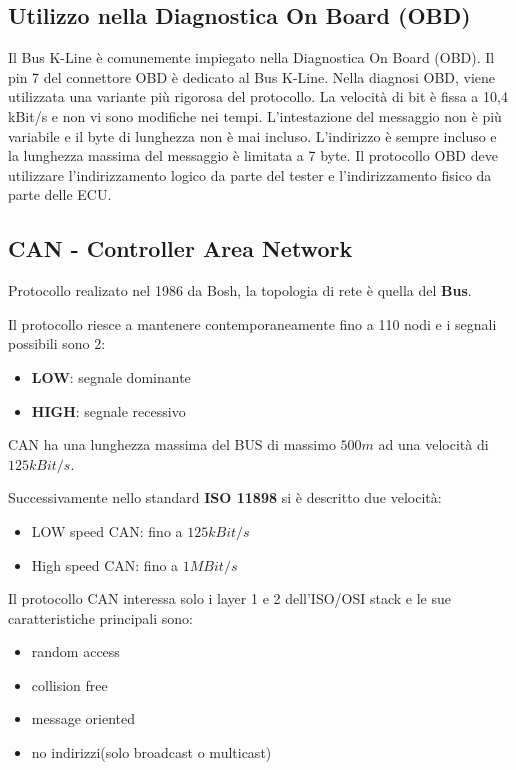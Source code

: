 \subsection{Utilizzo nella Diagnostica On Board (OBD)}

Il Bus K-Line è comunemente impiegato nella Diagnostica On Board (OBD). Il pin 7 del connettore OBD è dedicato al Bus K-Line. Nella diagnosi OBD, viene utilizzata una variante più rigorosa del protocollo. La velocità di bit è fissa a 10,4 kBit/s e non vi sono modifiche nei tempi. L'intestazione del messaggio non è più variabile e il byte di lunghezza non è mai incluso. L'indirizzo è sempre incluso e la lunghezza massima del messaggio è limitata a 7 byte. Il protocollo OBD deve utilizzare l'indirizzamento logico da parte del tester e l'indirizzamento fisico da parte delle ECU.








\subsection{CAN - Controller Area Network}

Protocollo realizato nel 1986 da Bosh, la topologia di rete è quella del \textbf{Bus}.

Il protocollo riesce a mantenere contemporaneamente fino a 110 nodi e i segnali possibili sono 2:
\begin{itemize}
  \item \textbf{LOW}: segnale dominante
  \item \textbf{HIGH}: segnale recessivo
\end{itemize}


CAN ha una lunghezza massima del BUS di massimo $500m$ ad una velocità di $125kBit/s$.


Successivamente nello standard \textbf{ISO 11898} si è descritto due velocità:
\begin{itemize}
  \item LOW speed CAN: fino a $125kBit/s$
  \item High speed CAN: fino a $1MBit/s$
\end{itemize}

Il protocollo CAN interessa solo i layer 1 e 2 dell'ISO/OSI stack e le sue caratteristiche principali sono:
\begin{itemize}
  \item random access
  \item collision free
  \item message oriented
  \item no indirizzi(solo broadcast o multicast)
\end{itemize}


